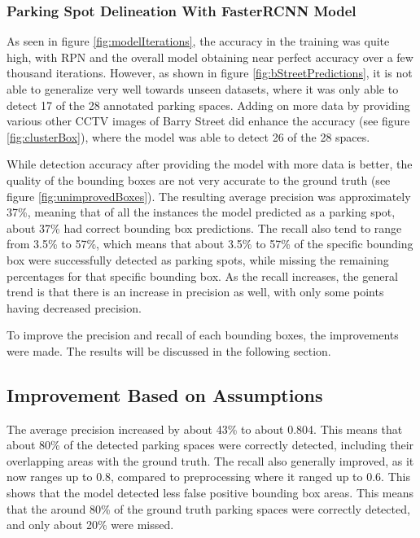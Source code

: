 \documentclass[man]{apa7}
\begin{document}
\subsubsection{Parking Spot Delineation With FasterRCNN Model}

As seen in figure \ref{fig:modelIterations}, the accuracy in the training was quite high, with RPN and the overall model obtaining near perfect accuracy over a few thousand iterations. However, as shown in figure \ref{fig:bStreetPredictions}, it is not able to generalize very well towards unseen datasets, where it was only able to detect 17 of the 28 annotated parking spaces. Adding on more data by providing various other CCTV images of Barry Street did enhance the accuracy (see figure \ref{fig:clusterBox}), where the model was able to detect 26 of the 28 spaces.

While detection accuracy after providing the model with more data is better, the quality of the bounding boxes are not very accurate to the ground truth (see figure \ref{fig:unimprovedBoxes}). The resulting average precision was approximately 37\%, meaning that of all the instances the model predicted as a parking spot, about 37\% had correct bounding box predictions. The recall also tend to range from 3.5\% to 57\%, which means that about 3.5\% to 57\% of the specific bounding box were successfully detected as parking spots, while missing the remaining percentages for that specific bounding box. As the recall increases, the general trend is that there is an increase in precision as well, with only some points having decreased precision.

To improve the precision and recall of each bounding boxes, the improvements were made. The results will be discussed in the following section.

\subsection{Improvement Based on Assumptions}
The average precision increased by about 43\% to about 0.804. This means that about 80\% of the detected parking spaces were correctly detected, including their overlapping areas with the ground truth. The recall also generally improved, as it now ranges up to 0.8, compared to preprocessing where it ranged up to 0.6. This shows that the model detected less false positive bounding box areas. This means that the around 80\% of the ground truth parking spaces were correctly detected, and only about 20\% were missed.
\end{document}
